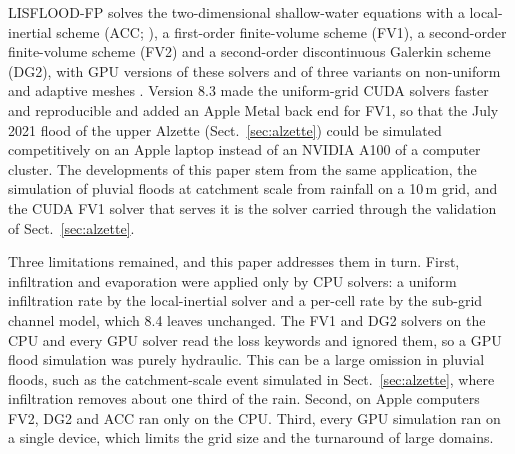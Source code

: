 \documentclass[gmd, manuscript]{copernicus}
\begin{document}
LISFLOOD-FP solves the two-dimensional shallow-water equations with a
local-inertial scheme (ACC; \citealp{BATES201033}), a first-order
finite-volume scheme (FV1), a second-order finite-volume scheme (FV2) and a
second-order discontinuous Galerkin scheme (DG2), with GPU versions of these
solvers and of three variants on non-uniform and adaptive meshes
\citep{Shaw2021,Sharifian2023,Chowdhury2025,LISFLOODFP82zenodo}.
Version 8.3 made the uniform-grid CUDA solvers faster and reproducible and
added an Apple Metal back end for FV1, so that
the July 2021 flood of the upper Alzette (Sect.~\ref{sec:alzette}) could be
simulated competitively on an Apple laptop instead of an NVIDIA A100 of a computer cluster.
The developments of this paper stem from the same application, the
simulation of pluvial floods at catchment scale from rainfall on a 10\,m
grid, and the CUDA FV1 solver that serves it is the solver carried through
the validation of Sect.~\ref{sec:alzette}.

Three limitations remained, and this paper addresses them in turn. First,
infiltration and evaporation were applied only by CPU solvers: a uniform
infiltration rate by the local-inertial solver and a per-cell rate by the
sub-grid channel model, which 8.4 leaves unchanged. The FV1 and DG2
solvers on the CPU and every GPU solver read the loss keywords and ignored
them, so a GPU flood simulation was purely hydraulic. This can be a large
omission in pluvial floods, such as the catchment-scale event simulated in
Sect.~\ref{sec:alzette}, where infiltration removes about one third of the
rain.
Second, on Apple computers FV2, DG2 and ACC ran only on the CPU. Third,
every GPU simulation ran on a single device, which limits the grid size and
the turnaround of large domains.
\end{document}
